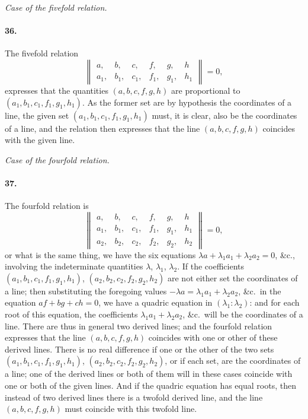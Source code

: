 \documentclass[11pt,a4paper]{article}
\begin{document}
\bigskip
\begin{center}
\textit{Case of the fivefold relation.}
\end{center}

\paragraph{36.}
The fivefold relation
\[
\begin{Vmatrix}
a, & b, & c, & f, & g, & h \\
a_1, & b_1, & c_1, & f_1, & g_1, & h_1
\end{Vmatrix} = 0,
\]
expresses that the quantities $(a,b,c,f,g,h)$ are proportional to $(a_1, b_1, c_1, f_1, g_1, h_1)$.
As the former set are by hypothesis the coordinates of a line, the given set
$(a_1, b_1, c_1, f_1, g_1, h_1)$ must, it is clear, also be the coordinates of a line, and the
relation then expresses that the line $(a,b,c,f,g,h)$ coincides with the given line.

\bigskip
\begin{center}
\textit{Case of the fourfold relation.}
\end{center}

\paragraph{37.}
The fourfold relation is
\[
\begin{Vmatrix}
a, & b, & c, & f, & g, & h \\
a_1, & b_1, & c_1, & f_1, & g_1, & h_1 \\
a_2, & b_2, & c_2, & f_2, & g_2, & h_2
\end{Vmatrix} = 0,
\]
or what is the same thing, we have the six equations $\lambda a + \lambda_1 a_1 + \lambda_2 a_2 = 0$,
\&c., involving the indeterminate quantities $\lambda$, $\lambda_1$, $\lambda_2$. If the coefficients
$(a_1, b_1, c_1, f_1, g_1, h_1)$, $(a_2, b_2, c_2, f_2, g_2, h_2)$ are not either set the coordinates
of a line; then substituting the foregoing values $-\lambda a = \lambda_1 a_1 + \lambda_2 a_2$, \&c.\ in the
equation $af + bg + ch = 0$, we have a quadric equation in $(\lambda_1 : \lambda_2)$: and for each
root of this equation, the coefficients $\lambda_1 a_1 + \lambda_2 a_2$, \&c.\ will be the coordinates of a
line. There are thus in general two derived lines; and the fourfold relation expresses
that the line $(a,b,c,f,g,h)$ coincides with one or other of these derived lines. There
is no real difference if one or the other of the two sets $(a_1, b_1, c_1, f_1, g_1, h_1)$,
$(a_2, b_2, c_2, f_2, g_2, h_2)$, or if each set, are the coordinates of a line; one of the
derived lines or both of them will in these cases coincide with one or both of the
given lines. And if the quadric equation has equal roots, then instead of two derived
lines there is a twofold derived line, and the line $(a,b,c,f,g,h)$ must coincide with
this twofold line.
\end{document}
